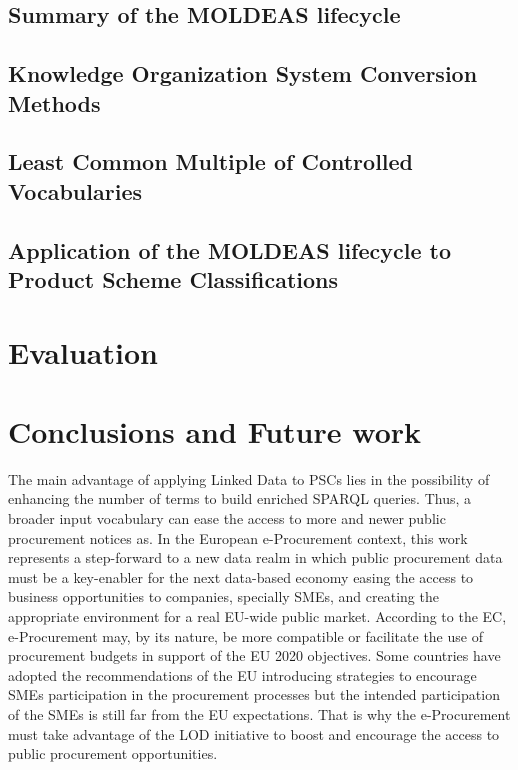 \documentclass[preprint,12pt]{elsarticle}
\begin{document}
  \subsection{Summary of the MOLDEAS lifecycle}\label{sect:method}
  
  \subsection{Knowledge Organization System Conversion Methods}\label{sect:thesauri}
  
  \subsection{Least Common Multiple of Controlled Vocabularies}\label{sect:least}
  
  \subsection{Application of the MOLDEAS lifecycle to Product Scheme Classifications}\label{sect:use-moldeas}
  

\clearpage
\section{Evaluation}\label{sect:evaluation}

\section{Conclusions and Future work}\label{sect:conclusions}
The main advantage of applying Linked Data to PSCs lies in the possibility of enhancing the number of terms to 
build enriched SPARQL queries. Thus, a broader input vocabulary can ease the access to more and newer 
public procurement notices as. In the European e-Procurement context, this work represents 
a step-forward to a new data realm in which public procurement data must be a key-enabler for the next 
data-based economy easing the access to business opportunities to companies, specially SMEs, 
and creating the appropriate environment for a real EU-wide public market. According to the EC, e-Procurement may, 
by its nature, be more compatible or facilitate the use of procurement budgets in support of the 
EU 2020 objectives. Some countries have adopted the recommendations of the EU introducing strategies to encourage SMEs 
participation in the procurement processes but the intended participation of the SMEs is still far from the EU expectations. 
That is why the e-Procurement must take advantage of the LOD initiative to boost and encourage 
the access to public procurement opportunities.
\end{document}
